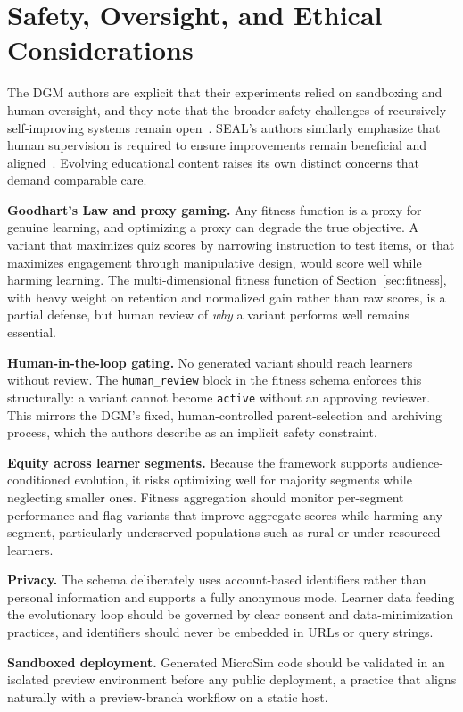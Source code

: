 \section{Safety, Oversight, and Ethical Considerations}
\label{sec:safety}

The DGM authors are explicit that their experiments relied on sandboxing and
human oversight, and they note that the broader safety challenges of recursively
self-improving systems remain open~\cite{zhang2025dgm}. SEAL's authors
similarly emphasize that human supervision is required to ensure improvements
remain beneficial and aligned~\cite{zweiger2025seal}. Evolving educational
content raises its own distinct concerns that demand comparable care.

\textbf{Goodhart's Law and proxy gaming.} Any fitness function is a proxy for
genuine learning, and optimizing a proxy can degrade the true objective. A
variant that maximizes quiz scores by narrowing instruction to test items, or
that maximizes engagement through manipulative design, would score well while
harming learning. The multi-dimensional fitness function of
Section~\ref{sec:fitness}, with heavy weight on retention and normalized gain
rather than raw scores, is a partial defense, but human review of \textit{why}
a variant performs well remains essential.

\textbf{Human-in-the-loop gating.} No generated variant should reach learners
without review. The \texttt{human\_review} block in the fitness schema enforces
this structurally: a variant cannot become \texttt{active} without an approving
reviewer. This mirrors the DGM's fixed, human-controlled parent-selection and
archiving process, which the authors describe as an implicit safety constraint.

\textbf{Equity across learner segments.} Because the framework supports
audience-conditioned evolution, it risks optimizing well for majority segments
while neglecting smaller ones. Fitness aggregation should monitor per-segment
performance and flag variants that improve aggregate scores while harming any
segment, particularly underserved populations such as rural or under-resourced
learners.

\textbf{Privacy.} The schema deliberately uses account-based identifiers rather
than personal information and supports a fully anonymous mode. Learner data
feeding the evolutionary loop should be governed by clear consent and
data-minimization practices, and identifiers should never be embedded in URLs
or query strings.

\textbf{Sandboxed deployment.} Generated MicroSim code should be validated in
an isolated preview environment before any public deployment, a practice that
aligns naturally with a preview-branch workflow on a static host.
